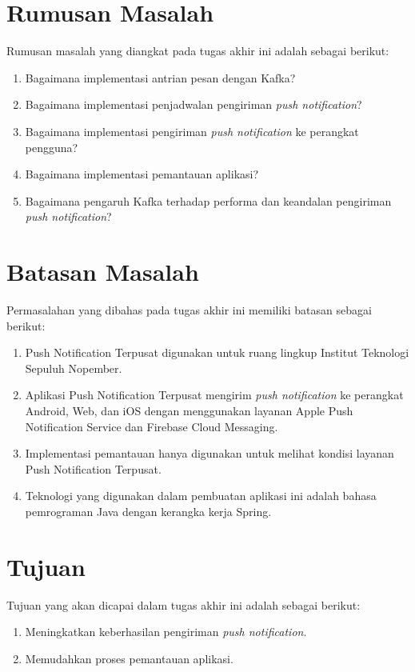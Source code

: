 \section {Rumusan Masalah}
Rumusan masalah yang diangkat pada tugas akhir ini adalah sebagai berikut:
\begin {enumerate}
\item Bagaimana implementasi antrian pesan dengan Kafka?
\item Bagaimana implementasi penjadwalan pengiriman \textit{push notification}?
\item Bagaimana implementasi pengiriman \textit{push notification} ke perangkat pengguna?
\item Bagaimana implementasi pemantauan aplikasi?
\item Bagaimana pengaruh Kafka terhadap performa dan keandalan pengiriman \textit{push notification}?
\end {enumerate}

\section {Batasan Masalah}
Permasalahan yang dibahas pada tugas akhir ini memiliki batasan sebagai berikut:
\begin {enumerate}
\item Push Notification Terpusat digunakan untuk ruang lingkup Institut Teknologi Sepuluh Nopember.
\item Aplikasi Push Notification Terpusat mengirim \textit{push notification} ke perangkat Android, Web, dan iOS dengan menggunakan layanan Apple Push Notification Service dan Firebase Cloud Messaging.
\item Implementasi pemantauan hanya digunakan untuk melihat kondisi layanan Push Notification Terpusat.
\item Teknologi yang digunakan dalam pembuatan aplikasi ini adalah bahasa pemrograman Java dengan kerangka kerja Spring.
\end {enumerate}

\section {Tujuan}
Tujuan yang akan dicapai dalam tugas akhir ini adalah sebagai berikut:
\begin{enumerate}
	\item Meningkatkan keberhasilan pengiriman \textit{push notification}.
	\item Memudahkan proses pemantauan aplikasi.
\end{enumerate}

